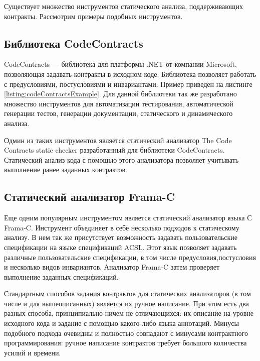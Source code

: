 Существует множество инструментов статического анализа, поддерживающих контракты. Рассмотрим примеры подобных инструментов.

\subsection{Библиотека CodeContracts}
CodeContracts --- библиотека для платформы .NET от компании Microsoft, позволяющая задавать контракты в исходном коде\cite{codeContracts}. Библиотека позволяет работать с предусловиями, постусловиями и инвариантами. Пример приведен на листинге \ref{listing:codeContractsExample}. Для данной библиотеки так же разработано множество инструментов для автоматизации тестирования, автоматической генерации тестов, генерации документации, статического и динамического анализа.


Одмин из таких инструментов является статический анализатор The Code Contracts static checker разработанный для библиотеки CodeContracts\cite{cccheck}. Статический анализ кода с помощью этого анализатора позволяет учитывать выполнение ранее заданных контрактов.

\subsection{Статический анализатор Frama-C}
Еще одним популярным инструментом является статический анализатор языка С Frama-C\cite{framaC}. Инструмент объединяет в себе несколько подходов к статическому анализу. В нем так же присутствует возможность задавать пользовательские спецификации на языке спецификаций ACSL\cite{acsl}. Этот язык позволяет задавать различные пользовательские спецификации, в том числе предусловия,постусловия и несколько видов инвариантов. Анализатор Frama-C затем проверяет выполнение заданных спецификаций.


Стандартным способов задания контрактов для статических анализаторов (в том числе и для вышеописанных) является их ручное написание. При этом есть два разных способа, принципиально ничем не отличающихся: их описание на уровне исходного кода и задание с помощью какого-либо языка аннотаций. Минусы подобного подхода очевидны и полностью совпадают с минусами контрактного программирования: ручное написание контрактов требует большого количества усилий и времени.

